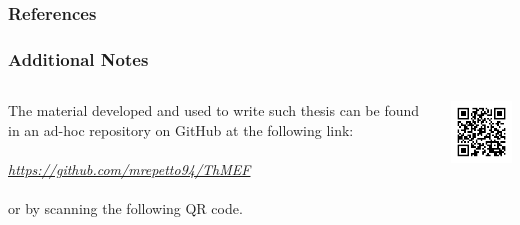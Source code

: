 \documentclass{beamer}
\begin{document}
\begin{frame}[t,allowframebreaks]
	    \frametitle{References}

\end{frame}

\begin{frame}
	\frametitle{Additional Notes}
	\justifying
\begin{columns}

The material developed and used to write such thesis can be found in an ad-hoc repository on GitHub at the following link: 
\\
\\
	\textit{\href{url}{https://github.com/mrepetto94/ThMEF}}
\\
\\
or by scanning the following QR code.
	\\

\includegraphics[width=\linewidth]{qrcode.png}

\end{columns}
\end{frame}
\end{document}
